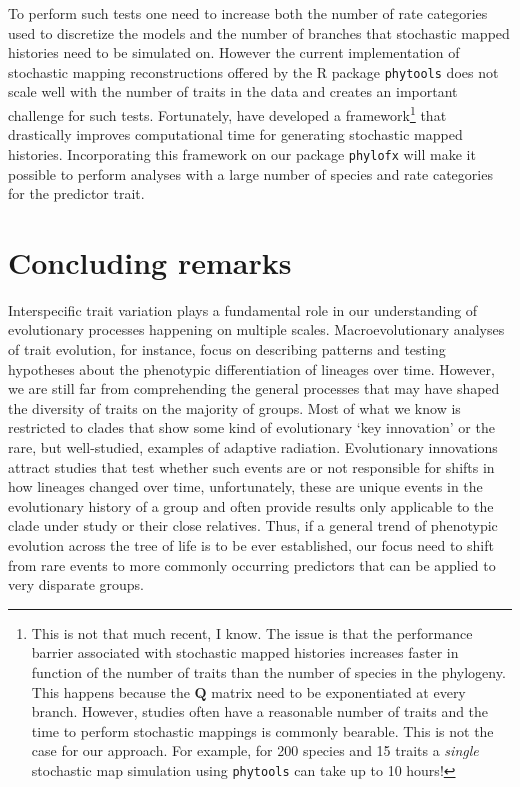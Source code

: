 To perform such tests one need to increase both the number of rate categories used to discretize the models and the number of branches that stochastic mapped histories need to be simulated on. However the current implementation of stochastic mapping reconstructions \citep{huelsenbeck_stochastic_2003} offered by the R package \texttt{phytools} \citep{revell_phytools:_2012} does not scale well with the number of traits in the data and creates an important challenge for such tests. Fortunately, \citet{irvahn_phylomap_2014} have developed a framework\footnote{This is not that much recent, I know. The issue is that the performance barrier associated with stochastic mapped histories increases faster in function of the number of traits than the number of species in the phylogeny. This happens because the $\mathbf{Q}$ matrix need to be exponentiated at every branch. However, studies often have a reasonable number of traits and the time to perform stochastic mappings is commonly bearable. This is not the case for our approach. For example, for 200 species and 15 traits a \textit{single} stochastic map simulation using \texttt{phytools} can take up to 10 hours!} that drastically improves computational time for generating stochastic mapped histories. Incorporating this framework on our package \texttt{phylofx} will make it possible to perform analyses with a large number of species and rate categories for the predictor trait.

\section{Concluding remarks}

Interspecific trait variation plays a fundamental role in our understanding of evolutionary processes happening on multiple scales. Macroevolutionary analyses of trait evolution, for instance, focus on describing patterns and testing hypotheses about the phenotypic differentiation of lineages over time. However, we are still far from comprehending the general processes that may have shaped the diversity of traits on the majority of groups. Most of what we know is restricted to clades that show some kind of evolutionary `key innovation' or the rare, but well-studied, examples of adaptive radiation. Evolutionary innovations attract studies that test whether such events are or not responsible for shifts in how lineages changed over time, unfortunately, these are unique events in the evolutionary history of a group and often provide results only applicable to the clade under study or their close relatives. Thus, if a general trend of phenotypic evolution across the tree of life is to be ever established, our focus need to shift from rare events to more commonly occurring predictors that can be applied to very disparate groups.

